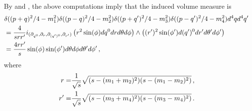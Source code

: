 By  and , the above computations imply that the induced volume measure is
\begin{align}
&\delta((p+q)^2/4-m_1^2)\delta((p-q)^2/4-m_2^2)\delta((p+q^{\prime})^2/4-m_3^2)\delta((p-q^{\prime})^2/4-m_4^2)d^4qd^4q^{\prime}\\
&=\frac{4}{srr^{\prime}}i_{(\partial_{q^0},\partial_{r},\partial _{(q^{\prime})^0},\partial_{r^{\prime}})}\left(r^2\sin(\phi)dq^0drd\theta d\phi\right)\wedge\left((r^{\prime})^2\sin(\phi^{\prime})d(q^{\prime})^0dr^{\prime}d\theta^{\prime}d\phi^{\prime}\right)\notag\\
&=\frac{4rr^{\prime}}{s}\sin(\phi)\sin(\phi^{\prime})d\theta d\phi d\theta^{\prime}d\phi^{\prime}\,,\notag
\end{align}
where
\begin{align}
r=&\frac{1}{\sqrt{s}}\sqrt{(s-(m_1+m_2)^2)(s-(m_1-m_2)^2)}\,,\\
r^{\prime}=&\frac{1}{\sqrt{s}}\sqrt{(s-(m_3+m_4)^2)(s-(m_3-m_4)^2)}\,.\notag
\end{align}


